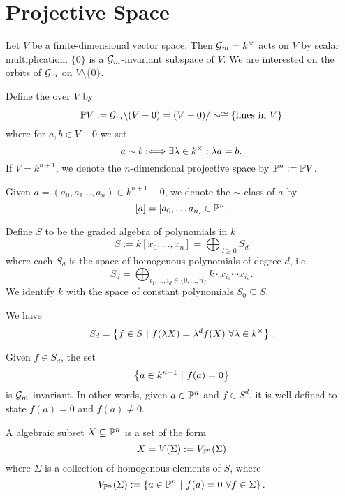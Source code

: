 \section{Projective Space}
Let $V$ be a finite-dimensional vector space. Then $\G_m = k^\times$ acts on $V$ by scalar multiplication. $\{0\}$ is a $\G_m$-invariant subspace of $V$. We are interested on the orbits of $\G_m$ on $V\setminus \{0\}$.

Define the  over $V$ by
\[ \P V := \G_m \backslash (V - 0) = (V- 0)/ \sim \isom{} \{ \text{lines in } V \} \]
where for $a, b \in V-0$ we set
\[ a\sim b : \Gdw{} \exists \lambda \in k^\times : \lambda a = b. \]
If $V = k^{n+1}$, we denote the $n$-dimensional projective space by $\P^n := \P V$.

Given $a = (a_0,a_1\ldots, a_{n}) \in k^{n+1} - 0$, we denote the $\sim$-class of $a$ by
\[ [a] = [a_0, \ldots a_{n}] \in \P^n. \]

Define $S$ to be the graded algebra of polynomials in $k$
\[S:= k[x_0, \ldots, x_n] = \bigoplus_{d \geq 0} S_d\]
where each $S_d$ is the space of homogenous polynomials of degree $d$, i.e.
\[ S_d = \bigoplus_{i_1, \ldots, i_d \in \{0,\ldots, n\}} k \cdot x_{i_1} \cdots x_{i_d}. \]
We identify $k$ with the space of constant polynomials $S_0 \subseteq S$.

We have
\[ S_d = \set{f \in S}{f(\lambda X) = \lambda^d f(X) ~\forall \lambda \in k^\times}. \]

Given $f \in S_d$, the set
\[ \set{a \in k^{n+1}}{f(a) = 0} \]
is $\G_m$-invariant. In other words, given $a \in \P^n$ and $f \in S^d$, it is well-defined to state $f(a) = 0$ and $f(a) \neq 0$.

\begin{definition}
	A  algebraic subset $X \subseteq \P^n$ is a set of the form
	\[ X = V(\Sigma) := V_{\P^n}(\Sigma) \]
	where $\Sigma$ is a collection of homogenous elements of $S$, where
	\[ V_{\P^n}(\Sigma) := \set{a \in \P^n}{ f(a) = 0 ~ \forall f \in \Sigma }. \]
\end{definition}
